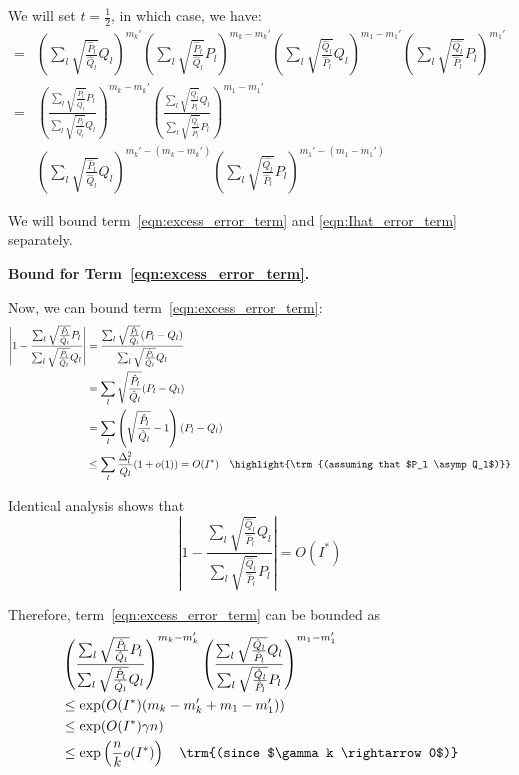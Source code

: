 \documentclass{article}
\begin{document}
We will set $t = \frac{1}{2}$, in which case, we have:
\begin{align}
=& \left( \sum_l \sqrt{\frac{\hat{P}_l}{\hat{Q}_l} } Q_l \right)^{m_k'}
 \left( \sum_l \sqrt{\frac{\hat{P}_l}{\hat{Q}_l} } P_l \right)^{m_k - m_k'}
 \left( \sum_l \sqrt{\frac{\hat{Q}_l}{\hat{P}_l} } Q_l \right)^{m_1 - m_1'}
       \left( \sum_l \sqrt{\frac{\hat{Q_l}}{\hat{P}_l} } P_l \right)^{m_1'} \nonumber \\
=&  \left( \frac{\sum_l \sqrt{\frac{\hat{P}_l}{\hat{Q}_l} } P_l}
                {\sum_l \sqrt{\frac{\hat{P}_l}{\hat{Q}_l} } Q_l}  \right)^{m_k - m_k'}
 \left( \frac{ \sum_l \sqrt{\frac{\hat{Q}_l}{\hat{P}_l} } Q_l}
             { \sum_l \sqrt{\frac{\hat{Q}_l}{\hat{P}_l} } P_l} \right)^{m_1 - m_1'}  
   \label{eqn:excess_error_term} \\
 & \left( \sum_l \sqrt{ \frac{\hat{P}_l}{\hat{Q}_l}} Q_l \right)^{m_k' - (m_k - m_k')} 
    \left( \sum_l \sqrt{\frac{\hat{Q_l}}{\hat{P}_l} } P_l \right)^{m_1' - (m_1 - m_1')}
   \label{eqn:Ihat_error_term} 
\end{align} 

We will bound term~\ref{eqn:excess_error_term} and \ref{eqn:Ihat_error_term} separately. 

\textbf{Bound for Term~\ref{eqn:excess_error_term}.} 

Now, we can bound term~\ref{eqn:excess_error_term}:
\begin{align*}
\left| 1 -  \frac{\sum_l \sqrt{\frac{\hat{P}_l}{\hat{Q}_l} } P_l}
                {\sum_l \sqrt{\frac{\hat{P}_l}{\hat{Q}_l} } Q_l}  \right|
 &= \frac{ \sum_l \sqrt{ \frac{\hat{P}_l}{\hat{Q}_l}} (P_l - Q_l) }
     { \sum_l \sqrt{ \frac{\hat{P}_l}{\hat{Q}_l}} Q_l } \\
&= \sum_l \sqrt{ \frac{\hat{P}_l}{\hat{Q}_l} }(P_l - Q_l) \\
&= \sum_{l} \left( \sqrt{ \frac{\hat{P}_l}{\hat{Q}_l} } - 1 \right) (P_l - Q_l)  \\
&\leq \sum_l \frac{\Delta^2_l}{Q_l}(1+o(1)) = O( I^* ) \quad 
   \highlight{\trm{(assuming that $P_l \asymp Q_l$)}}
\end{align*}

Identical analysis shows that
\[
\left| 1 - \frac{ \sum_l \sqrt{\frac{\hat{Q}_l}{\hat{P}_l} } Q_l}
             { \sum_l \sqrt{\frac{\hat{Q}_l}{\hat{P}_l} } P_l} \right| 
= O(I^*) 
\]

Therefore, term~\ref{eqn:excess_error_term} can be bounded as
\begin{align*}
&  \left( \frac{\sum_l \sqrt{\frac{\hat{P}_l}{\hat{Q}_l} } P_l}
                {\sum_l \sqrt{\frac{\hat{P}_l}{\hat{Q}_l} } Q_l}  \right)^{m_k - m_k'}
 \left( \frac{ \sum_l \sqrt{\frac{\hat{Q}_l}{\hat{P}_l} } Q_l}
             { \sum_l \sqrt{\frac{\hat{Q}_l}{\hat{P}_l} } P_l} \right)^{m_1 - m_1'}  \\
&\leq \exp( O(I^*) (m_k - m_k' + m_1 - m_1') ) \\
&\leq \exp( O(I^*) \gamma n) \\
&\leq \exp\left( \frac{n}{k} o(I^*) \right) \quad \trm{(since $\gamma k \rightarrow 0$)}
\end{align*}
\end{document}

